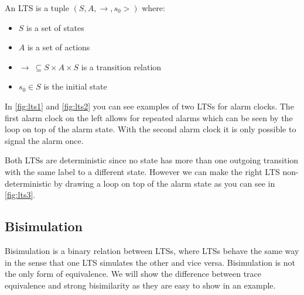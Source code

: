 \documentclass{clseminar}
\begin{document}
  An LTS is a tuple $(S, A, \to,s_0>)$ where: \\

  \begin{itemize}[noitemsep]
    \item $S$ is a set of states \\
    \item $A$ is a set of actions \\
    \item $\to\ \subseteq S \times A \times S$ is a transition relation \\
    \item $s_0 \in S$ is the initial state \\
  \end{itemize}

  \begin{figure}[!ht]
    \begin{minipage}{.5\linewidth}
      \centering
      
      \label{fig:lts1}
    \end{minipage}
    \begin{minipage}{.5\linewidth}
      \centering
      
      \label{fig:lts2}
    \end{minipage}
  \end{figure}

  In \autoref{fig:lts1} and \autoref{fig:lts2} you can see examples of two LTSs for alarm clocks. The first alarm clock on the left allows for repeated alarms which can be seen by the loop on top of the alarm state. With the second alarm clock it is only possible to signal the alarm once.

  Both LTSs are deterministic since no state has more than one outgoing transition with the same label to a different state. However we can make the right LTS non-deterministic by drawing a loop on top of the alarm state as you can see in \autoref{fig:lts3}. \\

  \begin{figure}[!ht]
    \centering
    
    \caption{}
    \label{fig:lts3}
  \end{figure}

  \subsection{Bisimulation}
  Bisimulation is a binary relation between LTSs, where LTSs behave the same way in the sense
  that one LTS simulates the other and vice versa. Bisimulation \cite{bisimulation_wiki} is not the only form of equivalence. We will show the difference between trace equivalence and strong bisimilarity as they are easy to show in an example.
\end{document}
